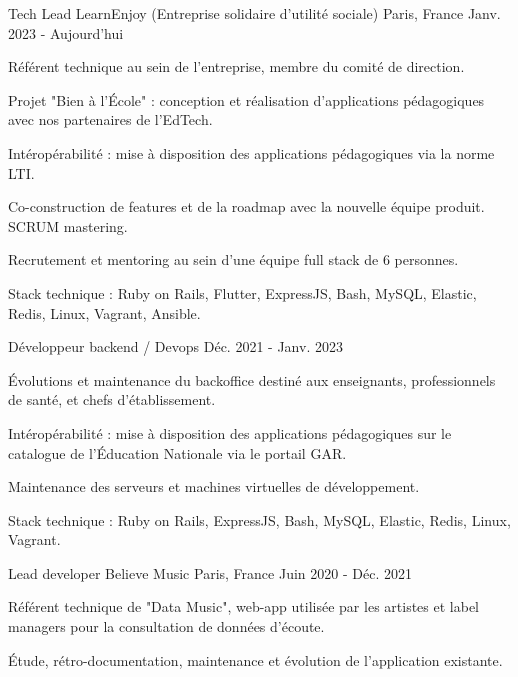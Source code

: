 \begin{cventries}
  \cventry
    {Tech Lead}
    {LearnEnjoy (Entreprise solidaire d'utilité sociale)}
    {Paris, France}
    {Janv. 2023 - Aujourd'hui}
    {
      \begin{cvitems}
        \item {Référent technique au sein de l'entreprise, membre du comité de direction.}
        \item {Projet "Bien à l'École" : conception et réalisation d'applications pédagogiques avec nos partenaires de l'EdTech.}
        \item {Intéropérabilité : mise à disposition des applications pédagogiques via la norme LTI.}
        \item {Co-construction de features et de la roadmap avec la nouvelle équipe produit. SCRUM mastering.}
        \item {Recrutement et mentoring au sein d'une équipe full stack de 6 personnes.}
        \item {Stack technique : Ruby on Rails, Flutter, ExpressJS, Bash, MySQL, Elastic, Redis, Linux, Vagrant, Ansible.}
      \end{cvitems}
      \vspace{-2.0mm}
    }
  \cventry
    {Développeur backend / Devops}
    {}
    {}
    {Déc. 2021 - Janv. 2023}
    {
      \begin{cvitems}
        \item {Évolutions et maintenance du backoffice destiné aux enseignants, professionnels de santé, et chefs d'établissement.}
        \item {Intéropérabilité : mise à disposition des applications pédagogiques sur le catalogue de l'Éducation Nationale via le portail GAR.}
        \item {Maintenance des serveurs et machines virtuelles de développement.}
        \item {Stack technique : Ruby on Rails, ExpressJS, Bash, MySQL, Elastic, Redis, Linux, Vagrant.}
      \end{cvitems}
    }
  \cventry
    {Lead developer}
    {Believe Music}
    {Paris, France}
    {Juin 2020 - Déc. 2021}
    {
      \begin{cvitems}
        \item {Référent technique de "Data Music", web-app utilisée par les artistes et label managers pour la consultation de données d'écoute.}
        \item {Étude, rétro-documentation, maintenance et évolution de l'application existante.}

\end{cvitems}}
\end{cventries}
